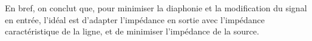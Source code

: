 \vspace{0.3cm}
\vspace{0.3cm}

En bref, on conclut que, pour minimiser la diaphonie et la modification du signal en entrée, l'idéal est d'adapter l'impédance en sortie avec l'impédance caractéristique de la ligne, et de minimiser l'impédance de la source.
